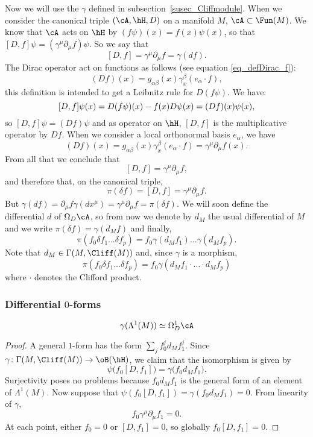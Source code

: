 Now we will use the $\gamma$ defined in subsection~\ref{susec_Cliffmodule}. When we consider the canonical triple $(\cA,\hH,D)$ on a manifold $M$, $\cA\subset\Fun(M)$. We know that $\cA$ acts on $\hH$ by $(f\psi)(x)=f(x)\psi(x)$, so that $[D,f]\psi=(\gamma^{\mu}\partial_{\mu}f)\psi$. So we say that
\[
	[D,f]=\gamma^{\mu}\partial_{\mu}f=\gamma(df).
\]
The Dirac operator act on functions as follows (see equation \eqref{eq_defDirac_f}):
\[
	(Df)(x)=g_{\alpha\beta}(x)\gamma^{\beta}_x(e_{\alpha}\cdot f),
\]
this definition is intended to get a Leibnitz rule for $D(f\psi)$. We have:
\[
	[D,f]\psi(x)=D(f\psi)(x)-f(x)D\psi(x)\\
	=(Df)(x)\psi(x),
\]
so $[D,f]\psi=(Df)\psi$ and as operator on $\hH$, $[D,f]$ is the multiplicative operator by $Df$. When we consider a local orthonormal basis $e_{\alpha}$, we have
\[
	(Df)(x)=g_{\alpha\beta}(x)\gamma_x^{\beta}(e_{\alpha}\cdot f)
	=\gamma^{\mu}\partial_{\mu}f(x).
\]
From all that we conclude that
\[
	[D,f]=\gamma^{\mu}\partial_{\mu}f,
\]
and therefore that, on the canonical triple,
\begin{equation}
	\pi(\delta f)=[D,f]=\gamma^{\mu}\partial_{\mu}f.
\end{equation}
But $\gamma(df)=\partial_{\mu}f\gamma(dx^{\mu})=\gamma^{\mu}\partial_{\mu}f=\pi(\delta f)$. We will soon define the differential $d$ of $\Omega_D\cA$, so from now we denote by $d_M$ the usual differential of $M$ and we write $\pi(\delta f)=\gamma(d_Mf)$ and finally,
\begin{equation}
	\pi(f_0\delta f_1\ldots \delta f_p)=f_0\gamma(d_Mf_1)\ldots\gamma(d_Mf_p).
\end{equation}
Note that $d_M\in\Gamma(M,\Cliff(M))$ and, since $\gamma$ is a morphism,
\begin{equation} \label{EqpildotsdeltagamdM}
	\pi(f_0\delta f_1\ldots\delta f_p)=f_0\gamma(d_Mf_1\cdot\ldots\cdot d_Mf_p)
\end{equation}
where $\cdot$ denotes the Clifford product.


\subsubsection{Differential \texorpdfstring{$0$}{0}-forms}

\begin{lemma}
	\[
		\gamma(\Lambda^1(M))\simeq\Omega^1_D\cA
	\]
\end{lemma}

\begin{proof}

	A general $1$-form has the form $\sum_j f_0^jd_Mf_1^j$. Since $\gamma\colon \Gamma(M,\Cliff(M))\to \oB(\hH)$, we claim that the isomorphism is given by
	\[
		\psi\big( f_0[D,f_1] \big)=\gamma\big( f_0d_Mf_1 \big).
	\]
	Surjectivity poses no problems because $f_0d_Mf_1$ is the general form of an element of $\Lambda^1(M)$. Now suppose that $\psi(f_0[D,f_1])=\gamma(f_0d_Mf_1)=0$. From linearity of $\gamma$,
	\[
		f_0\gamma^{\mu}\partial_{\mu}f_1=0.
	\]
	At each point, either $f_0=0$ or $[D,f_1]=0$, so globally $f_0[D,f_1]=0$.
\end{proof}


